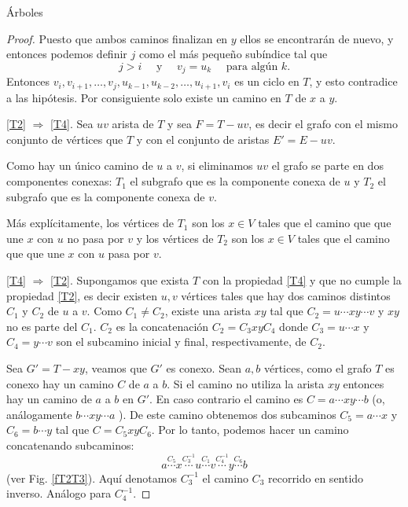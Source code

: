 \begin{section}{Árboles}
\begin{proof}
Puesto que ambos caminos finalizan en $y$ ellos se encontrarán de nuevo, y entonces podemos definir $j$ como el más pequeño subíndice tal que
$$
j>i \quad \text{ y } \quad v_j=u_k \quad \text{ para algún } k.
$$
Entonces $v_i,v_{i+1},\ldots,v_j,u_{k-1},u_{k-2},\ldots,u_{i+1},v_i$ es un ciclo en $T$, y esto contradice a las hipótesis. Por consiguiente solo existe un camino en $T$ de $x$ a $y$.


\noindent  \ref{T2} $\Rightarrow$ \ref{T4}. Sea $uv$  arista de $T$ y sea  $F = T -uv$,  es decir el grafo con el mismo conjunto de vértices que $T$ y con el conjunto de aristas $E'=E-uv$. 

Como hay un único camino de $u$  a $v$, si eliminamos $uv$ el grafo se parte en dos componentes conexas:  $T_1$ el subgrafo que es la componente conexa de $u$ y $T_2$ el subgrafo que es la componente conexa de $v$. 

Más explícitamente, los vértices de $T_1$ son los $x \in V$ tales que  el camino que que une $x$ con $u$ no pasa por $v$ y los vértices de $T_2$ son los $x \in V$ tales que  el camino que que une $x$ con $u$ pasa por $v$. 

\noindent  \ref{T4} $\Rightarrow$ \ref{T2}. Supongamos que exista $T$ con la propiedad \ref{T4} y que no cumple la propiedad \ref{T2},  es decir existen $u,v$  vértices tales que hay dos caminos distintos  $C_1$ y $C_2$ de $u$  a $v$. Como $C_1 \ne C_2$, existe una arista $xy$  tal que  $C_2 = u \cdots xy \cdots v$ y $xy$  no es parte del $C_1$. $C_2$  es la concatenación  $C_2=C_3xyC_4$ donde $C_3 = u \cdots x$ y $C_4 = y \cdots v$ son el subcamino inicial y final, respectivamente, de $C_2$. 

Sea $G' = T-xy$,  veamos que $G'$ es conexo. Sean $a,b$  vértices,  como el grafo $T$  es conexo hay un camino $C$ de $a$ a $b$. Si el camino no utiliza la arista $xy$  entonces hay un camino de $a$ a $b$ en $G'$. En  caso contrario el camino es  $C = a \cdots xy \cdots b$ (o,  análogamente $b \cdots xy \cdots a$ ). De este camino obtenemos dos subcaminos $C_5= a \cdots x$ y $C_6= b \cdots y$ tal que $C =C_5xyC_6$.  Por lo tanto, podemos hacer un camino concatenando subcaminos:  
$$
a \stackrel{C_5}{\cdots} x \stackrel{C_3^{-1}}{\cdots} u \stackrel{C_1}{\cdots} v \stackrel{C_4^{-1}}{\cdots} y \stackrel{C_6}{\cdots} b
$$
(ver Fig. \ref{fT2T3}). Aquí denotamos $C_3^{-1}$ el camino $C_3$ recorrido en sentido inverso. Análogo  para $C_4^{-1}$.  



\end{proof}
\end{section}
